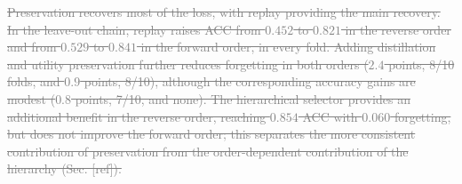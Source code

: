 \documentclass{article}
\newif\ifmarkup \markuptrue
\newcommand{\repc}[3]{\ifmarkup\textcolor{gray}{\sout{#2}}\textcolor{#1}{#3}\else#3\fi}
\newcommand{\repG}[2]{\repc{teal}{#1}{#2}}    %
\begin{document}
\begin{table}[!htb]
\centering\footnotesize\renewcommand{\arraystretch}{0.92}
\setlength{\tabcolsep}{2.2pt}
\caption{\textbf{Preservation components and what each retains} (single-level selector, fold 1, 5-seed means, reverse order). $\Delta U$ is the per-slide change in equal-weight evidence utility on old-task slides, with the initial and final evidence sets both scored under the final eight-class head.}
\label{tab:ablation}
\end{table}

\repG{Preservation recovers most of the loss, with replay providing the main recovery. In the leave-out chain, replay raises ACC from $0.452$ to $0.821$ in the reverse order and from $0.529$ to $0.841$ in the forward order, in every fold. Adding distillation and utility preservation further reduces forgetting in both orders ($2.4$ points, 8/10 folds, and $0.9$ points, 8/10), although the corresponding accuracy gains are modest ($0.8$ points, 7/10, and none). The hierarchical selector provides an additional benefit in the reverse order, reaching $0.854$ ACC with $0.060$ forgetting, but does not improve the forward order; this separates the more consistent contribution of preservation from the order-dependent contribution of the hierarchy (Sec. [ref]).}{}
\end{document}

